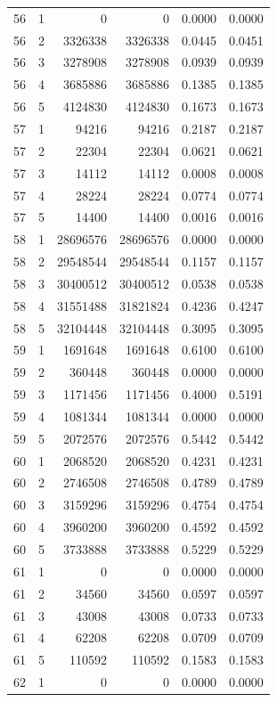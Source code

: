 \begin{longtable}{rrrrrr}
56 & 1 & 0 & 0 & 0.0000 & 0.0000 \\
56 & 2 & 3326338 & 3326338 & 0.0445 & 0.0451 \\
56 & 3 & 3278908 & 3278908 & 0.0939 & 0.0939 \\
56 & 4 & 3685886 & 3685886 & 0.1385 & 0.1385 \\
56 & 5 & 4124830 & 4124830 & 0.1673 & 0.1673 \\
57 & 1 & 94216 & 94216 & 0.2187 & 0.2187 \\
57 & 2 & 22304 & 22304 & 0.0621 & 0.0621 \\
57 & 3 & 14112 & 14112 & 0.0008 & 0.0008 \\
57 & 4 & 28224 & 28224 & 0.0774 & 0.0774 \\
57 & 5 & 14400 & 14400 & 0.0016 & 0.0016 \\
58 & 1 & 28696576 & 28696576 & 0.0000 & 0.0000 \\
58 & 2 & 29548544 & 29548544 & 0.1157 & 0.1157 \\
58 & 3 & 30400512 & 30400512 & 0.0538 & 0.0538 \\
58 & 4 & 31551488 & 31821824 & 0.4236 & 0.4247 \\
58 & 5 & 32104448 & 32104448 & 0.3095 & 0.3095 \\
59 & 1 & 1691648 & 1691648 & 0.6100 & 0.6100 \\
59 & 2 & 360448 & 360448 & 0.0000 & 0.0000 \\
59 & 3 & 1171456 & 1171456 & 0.4000 & 0.5191 \\
59 & 4 & 1081344 & 1081344 & 0.0000 & 0.0000 \\
59 & 5 & 2072576 & 2072576 & 0.5442 & 0.5442 \\
60 & 1 & 2068520 & 2068520 & 0.4231 & 0.4231 \\
60 & 2 & 2746508 & 2746508 & 0.4789 & 0.4789 \\
60 & 3 & 3159296 & 3159296 & 0.4754 & 0.4754 \\
60 & 4 & 3960200 & 3960200 & 0.4592 & 0.4592 \\
60 & 5 & 3733888 & 3733888 & 0.5229 & 0.5229 \\
61 & 1 & 0 & 0 & 0.0000 & 0.0000 \\
61 & 2 & 34560 & 34560 & 0.0597 & 0.0597 \\
61 & 3 & 43008 & 43008 & 0.0733 & 0.0733 \\
61 & 4 & 62208 & 62208 & 0.0709 & 0.0709 \\
61 & 5 & 110592 & 110592 & 0.1583 & 0.1583 \\
62 & 1 & 0 & 0 & 0.0000 & 0.0000 \\

\end{longtable}
